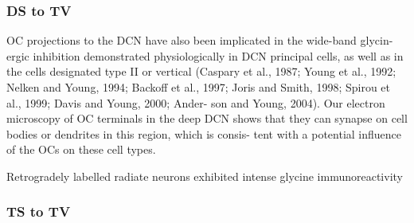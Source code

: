 \subsubsection{DS to TV}

OC projections to the DCN have also been implicated in the wide-band glycin-
ergic inhibition demonstrated physiologically in DCN principal cells, as well as
in the cells designated type II or vertical (Caspary et al., 1987; Young et al.,
1992; Nelken and Young, 1994; Backoff et al., 1997; Joris and Smith, 1998;
Spirou et al., 1999; Davis and Young, 2000; Ander- son and Young, 2004). Our
electron microscopy of OC terminals in the deep DCN shows that they can synapse
on cell bodies or dendrites in this region, which is consis- tent with a
potential inﬂuence of the OCs on these cell types.

\citep{DoucetRossEtAl:1999,DoucetRyugo:1997,FriedlandPongstapornEtAl:2003,DoucetRyugo:2006}
Retrogradely labelled radiate neurons exhibited intense glycine immunoreactivity

\subsubsection{TS to TV}



